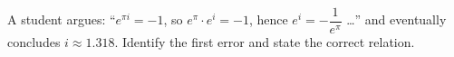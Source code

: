 A student argues: ``$e^{\pi i}=-1$, so $e^\pi\cdot e^i=-1$, hence $e^i=-\dfrac1{e^\pi}$ \ldots'' and eventually concludes $i\approx1.318$. Identify the first error and state the correct relation.
